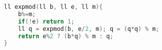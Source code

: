 \begin{lstlisting}[language=C++]
ll expmod(ll b, ll e, ll m){
	b%=m;
	if(!e) return 1;
	ll q = expmod(b, e/2, m); q = (q*q) % m;
	return e%2 ? (b*q) % m : q;
}
\end{lstlisting}